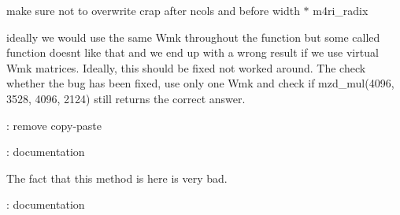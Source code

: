 
\begin{DoxyRefList}
\item[Member \mbox{\hyperlink{strassen_8h_a6ad9c4c4d3ab2ec65f610a17d66cebb0}{\+\_\+mzd\+\_\+addmul\+\_\+even}} (\mbox{\hyperlink{structmzd__t}{mzd\+\_\+t}} $\ast$C, \mbox{\hyperlink{structmzd__t}{mzd\+\_\+t}} const $\ast$A, \mbox{\hyperlink{structmzd__t}{mzd\+\_\+t}} const $\ast$B, int cutoff)]\label{todo__todo000013}%
%
make sure not to overwrite crap after ncols and before width $\ast$ m4ri\+\_\+radix  
\item[Member \mbox{\hyperlink{strassen_8h_a8432a43d231b2aeaf118d21b35d817ce}{\+\_\+mzd\+\_\+mul\+\_\+even}} (\mbox{\hyperlink{structmzd__t}{mzd\+\_\+t}} $\ast$C, \mbox{\hyperlink{structmzd__t}{mzd\+\_\+t}} const $\ast$A, \mbox{\hyperlink{structmzd__t}{mzd\+\_\+t}} const $\ast$B, int cutoff)]\label{todo__todo000012}%
%
ideally we would use the same Wmk throughout the function but some called function doesn\textquotesingle{}t like that and we end up with a wrong result if we use virtual Wmk matrices. Ideally, this should be fixed not worked around. The check whether the bug has been fixed, use only one Wmk and check if mzd\+\_\+mul(4096, 3528, 4096, 2124) still returns the correct answer.  
\item[Member \mbox{\hyperlink{classcore_1_1domain_1_1CartesianSearch_a40aebd1ac557c77a5b52dda0cece8dc7}{core::domain::Cartesian\+Search::Cartesian\+Search}} (std\+::vector$<$ std\+::vector$<$ std\+::vector$<$ Mini\+::\+Lit $>$$>$$>$ const \&cartesian)]\label{todo__todo000001}%
%
\+: remove copy-\/paste  
\item[Member \mbox{\hyperlink{classcore_1_1sat_1_1prop_1_1Prop_aab9c1cd482357671052b7e31030d8728}{core::sat::prop::Prop::prop\+\_\+tree}} (vec\+\_\+lit\+\_\+t const \&vars, uint32\+\_\+t head\+\_\+size)]\label{todo__todo000018}%
%
\+: documentation  
\item[Member \mbox{\hyperlink{classea_1_1instance_1_1Instance_a597c6255ccc1a074c3b7e96f2382e412}{ea::instance::Instance::num\+\_\+vars}} () const noexcept]\label{todo__todo000002}%
%
The fact that this method is here is very bad.  
\item[Member \mbox{\hyperlink{structea_1_1instance_1_1SharedData_a8dd49d06ea133389631da15b60576ae9}{ea::instance::Shared\+Data::base\+\_\+assumption}} ]\label{todo__todo000003}%
%
\+: documentation  
\item[Member \mbox{\hyperlink{misc_8h_a99247474582ef8ad10ddabd2be39af61}{m4ri\+\_\+die}} (const char $\ast$errormessage,...)]\label{todo__todo000004}%

\end{DoxyRefList}

